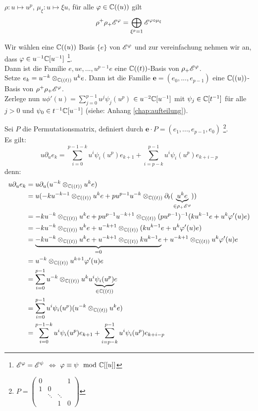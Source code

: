 \begin{lem}
  $\rho:u\mapsto u^p$,
  $\mu_\xi:u\mapsto\xi u$,
  für alle $\varphi \in {\mathbb C}((u))$ gilt
  $$ \rho^+\rho_+{\mathscr E}^\varphi=\bigoplus_{\xi^p=1}{\mathscr E}^{\varphi\circ\mu_\xi} $$
\end{lem}


Wir wählen eine ${\mathbb C}((u))$ Basis $\{e\}$ von ${\mathscr E}^\varphi$ und zur
vereinfachung nehmen wir an, dass $\varphi\in u^{-1}{\mathbb C}[u^{-1}]$
\footnote{${\mathscr E}^\varphi={\mathscr E}^\psi$ $\Leftrightarrow$ $\varphi\equiv\psi\mod{{\mathbb C}}[[u]]$}.\\
Dann ist die Familie $e,ue,...,u^{p-1}e$ eine ${\mathbb C}((t))$-Basis von
$\rho_+{\mathscr E}^\varphi$.\\
Setze $e_k=u^{-k}\otimes_{{\mathbb C}((t))}u^ke$.
Dann ist die Familie $\mathbf{e}=(e_0,...,e_{p-1})$ eine ${\mathbb C}((u))$-Basis von
$\rho^+\rho_+{\mathscr E}^\varphi$.\\
Zerlege nun $u\phi'(u)=\sum_{j=0}^{p-1}u^j\psi_j(u^p)$ $\in u^{-2}{\mathbb C}[u^{-1}]$ 
mit $\psi_j\in{\mathbb C}[t^{-1}]$ für alle $j>0$ und $\psi_0\in t^{-1}{\mathbb C}[u^{-1}]$
(siehe: Anhang \ref{chap:aufteilung}).

Sei $P$ die Permutationsmatrix, definiert durch
$\mathbf{e}\cdot P=(e_1,...,e_{p-1},e_0)$
\footnote{$P=\begin{pmatrix}0 &  &  & 1\\
1 & 0\\
 & \ddots & \ddots\\
 &  & 1 & 0
\end{pmatrix}$}.\\
Es gilt:\\
$$ u\partial_ue_k= \sum_{i=0}^{p-1-k}u^i\psi_i(u^p)e_{k+1} +
\sum_{i=p-k}^{p-1}u^i\psi_i(u^p)e_{k+i-p} $$
denn:\\
\begin{align*}
  u\partial_ue_k &= u\partial_u(u^{-k}\otimes_{{\mathbb C}((t))}u^ke)\\
  &= u(-ku^{-k-1}\otimes_{{\mathbb C}((t))}u^ke +
    pu^{p-1}u^{-k}\otimes_{{\mathbb C}((t))}\partial_t
    (\underset{\in\rho_+{\mathscr E}^\varphi}{\underbrace{u^ke}}))\\
  &= -ku^{-k}\otimes_{{\mathbb C}((t))}u^ke +
    pu^{p-1}u^{-k+1}\otimes_{{\mathbb C}((t))}(pu^{p-1})^{-1} (ku^{k-1}e 
    + u^k\varphi'(u)e)\\
  &= -ku^{-k}\otimes_{{\mathbb C}((t))}u^ke +
    u^{-k+1}\otimes_{{\mathbb C}((t))}(ku^{k-1}e + u^k\varphi'(u)e)\\
  &= \underset{=0}{\underbrace{-ku^{-k}\otimes_{{\mathbb C}((t))}u^ke +
    u^{-k+1}\otimes_{{\mathbb C}((t))}ku^{k-1}e}} +
    u^{-k+1}\otimes_{{\mathbb C}((t))}u^k\varphi'(u)e\\
  &= u^{-k}\otimes_{{\mathbb C}((t))}u^{k+1}\varphi'(u)e\\
  &= \sum_{i=0}^{p-1}u^{-k}\otimes_{{\mathbb C}((t))}
    u^{k}u^i\underset{\in{\mathbb C}((t))}{\underbrace{\psi_i(u^p)}}e\\
  &= \sum_{i=0}^{p-1}u^i\psi_i(u^p)(u^{-k}\otimes_{{\mathbb C}((t))} u^{k}e)\\
  &= \sum_{i=0}^{p-1-k}u^i\psi_i(u^p)e_{k+1} +
  \sum_{i=p-k}^{p-1}u^i\psi_i(u^p)e_{k+i-p}
\end{align*}

